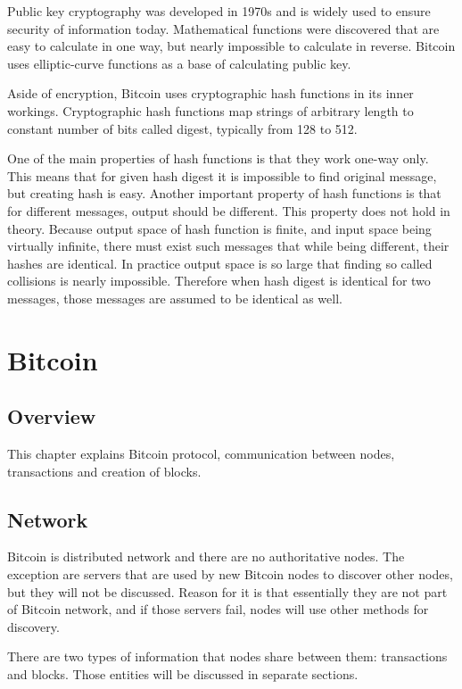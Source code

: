 \documentclass[12pt, en, eng, oneside]{mgr}
\begin{document}
Public key cryptography was developed in 1970s and is widely used to ensure security of information today. Mathematical functions were discovered that are easy to calculate in one way, but nearly impossible to calculate in reverse. Bitcoin uses elliptic-curve functions as a base of calculating public key.\cite{bartek}

Aside of encryption, Bitcoin uses cryptographic hash functions in its inner workings. Cryptographic hash functions map strings of arbitrary length to constant number of bits called digest, typically from 128 to 512. 

One of the main properties of hash functions is that they work one-way only. This means that for given hash digest it is impossible to find original message, but creating hash is easy. Another important property of hash functions is that for different messages, output should be different. This property does not hold in theory. Because output space of hash function is finite, and input space being virtually infinite, there must exist such messages that while being different, their hashes are identical. In practice output space is so large that finding so called collisions is nearly impossible. Therefore when hash digest is identical for two messages, those messages are assumed to be identical as well.  \cite{hash-functions}


\chapter{Bitcoin}

\section{Overview}

This chapter explains Bitcoin protocol, communication between nodes, transactions and creation of blocks.

\section{Network}
Bitcoin is distributed network and there are no authoritative nodes. The exception are servers that are used by new Bitcoin nodes to discover other nodes, but they will not be discussed. Reason for it is that essentially they are not part of Bitcoin network, and if those servers fail, nodes will use other methods for discovery. 

There are two types of information that nodes share between them: transactions and blocks. \cite{bitcoin-paper-1} Those entities will be discussed in separate sections.
\end{document}
